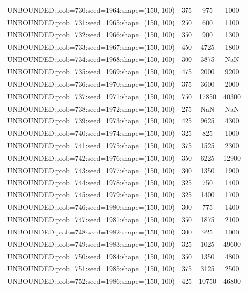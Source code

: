 \begin{longtable}{lccc}
UNBOUNDED:prob=730:seed=1964:shape=(150, 100) &      375 &   975 &   1000 \\
UNBOUNDED:prob=731:seed=1965:shape=(150, 100) &      250 &   600 &   1100 \\
UNBOUNDED:prob=732:seed=1966:shape=(150, 100) &      350 &   900 &   1300 \\
UNBOUNDED:prob=733:seed=1967:shape=(150, 100) &      450 &  4725 &   1800 \\
UNBOUNDED:prob=734:seed=1968:shape=(150, 100) &      300 &  3875 &    NaN \\
UNBOUNDED:prob=735:seed=1969:shape=(150, 100) &      475 &  2000 &   9200 \\
UNBOUNDED:prob=736:seed=1970:shape=(150, 100) &      375 &  3600 &   2000 \\
UNBOUNDED:prob=737:seed=1971:shape=(150, 100) &      750 & 17850 &  40300 \\
UNBOUNDED:prob=738:seed=1972:shape=(150, 100) &      275 &   NaN &    NaN \\
UNBOUNDED:prob=739:seed=1973:shape=(150, 100) &      425 &  9625 &   4300 \\
UNBOUNDED:prob=740:seed=1974:shape=(150, 100) &      325 &   825 &   1000 \\
UNBOUNDED:prob=741:seed=1975:shape=(150, 100) &      375 &  1525 &   2300 \\
UNBOUNDED:prob=742:seed=1976:shape=(150, 100) &      350 &  6225 &  12900 \\
UNBOUNDED:prob=743:seed=1977:shape=(150, 100) &      300 &  1350 &   1900 \\
UNBOUNDED:prob=744:seed=1978:shape=(150, 100) &      325 &   750 &   1400 \\
UNBOUNDED:prob=745:seed=1979:shape=(150, 100) &      325 &  1400 &   1700 \\
UNBOUNDED:prob=746:seed=1980:shape=(150, 100) &      300 &   775 &   1400 \\
UNBOUNDED:prob=747:seed=1981:shape=(150, 100) &      350 &  1875 &   2100 \\
UNBOUNDED:prob=748:seed=1982:shape=(150, 100) &      300 &   925 &   1000 \\
UNBOUNDED:prob=749:seed=1983:shape=(150, 100) &      325 &  1025 &  49600 \\
UNBOUNDED:prob=750:seed=1984:shape=(150, 100) &      350 &  1350 &   4800 \\
UNBOUNDED:prob=751:seed=1985:shape=(150, 100) &      375 &  3125 &   2500 \\
UNBOUNDED:prob=752:seed=1986:shape=(150, 100) &      425 & 10750 &  46800 \\

\end{longtable}
